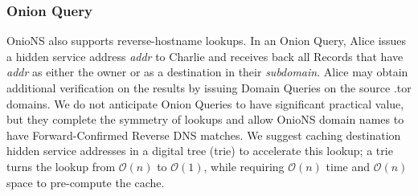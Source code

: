\documentclass[USenglish,oneside,twocolumn]{article}
\begin{document}
\subsubsection{Onion Query} %

OnioNS also supports reverse-hostname lookups. In an Onion Query, Alice issues a hidden service address \emph{addr} to Charlie and receives back all Records that have \emph{addr} as either the owner or as a destination in their \emph{subdomain}. Alice may obtain additional verification on the results by issuing Domain Queries on the source .tor domains. We do not anticipate Onion Queries to have significant practical value, but they complete the symmetry of lookups and allow OnioNS domain names to have Forward-Confirmed Reverse DNS matches. We suggest caching destination hidden service addresses in a digital tree (trie) to accelerate this lookup; a trie turns the lookup from $ \mathcal{O}(n) $ to $ \mathcal{O}(1) $, while requiring $ \mathcal{O}(n) $ time and $ \mathcal{O}(n) $ space to pre-compute the cache.



\end{document}
